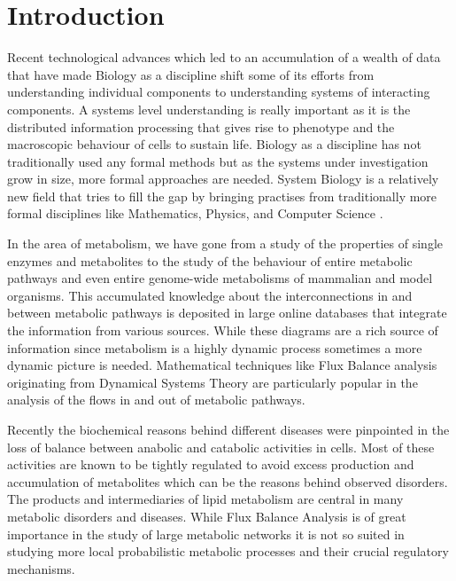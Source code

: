 

\chapter{Introduction}  %

\ifpdf
    \graphicspath{{Chapter1/Figs/Raster/}{Chapter1/Figs/PDF/}{Chapter1/Figs/}}
\else
    \graphicspath{{Chapter1/Figs/Vector/}{Chapter1/Figs/}}
\fi

Recent technological advances which led to an accumulation
of a wealth of data that have made Biology as a
discipline shift some of its efforts from understanding individual
components to understanding systems of interacting components. A
systems level understanding is really important
as it is the distributed information processing that gives rise to phenotype and the macroscopic
behaviour of cells to sustain life. Biology as a discipline has not traditionally used
any formal methods but as the systems under investigation grow in size,
more formal approaches are needed. System Biology is a relatively
new field that tries to fill the gap by bringing practises from
traditionally more formal disciplines like Mathematics, Physics, and
Computer Science \cite [] {ideker2001new}.

In the area of metabolism, we have gone from a study of the properties
of single enzymes and metabolites to the study of the behaviour of
entire metabolic pathways and even entire genome-wide metabolisms
of mammalian and model organisms. This accumulated knowledge about the
interconnections in and between metabolic pathways is deposited in
large online databases that integrate the information from various
sources. While these diagrams are a rich source of information
since metabolism is a highly dynamic process sometimes a more dynamic
picture is needed. Mathematical techniques like Flux Balance analysis
originating from Dynamical Systems Theory are particularly popular in
the analysis of the flows in and out of metabolic pathways.

Recently the biochemical reasons behind
different diseases were pinpointed  in the loss of balance between anabolic and catabolic
activities in cells. Most of these activities are known to be tightly
regulated to avoid excess production and accumulation of metabolites
which can be the reasons behind observed disorders. The products and
intermediaries of lipid metabolism are central in many metabolic
disorders and diseases. While Flux Balance
Analysis is of great importance in the study of large metabolic
networks it is not so suited in studying more local probabilistic metabolic
processes and their crucial regulatory mechanisms.

